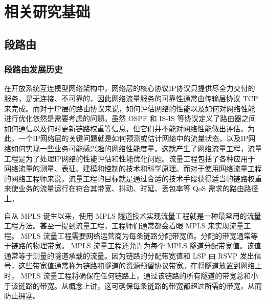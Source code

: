 
\chapter{相关研究基础}


\section{段路由}

\subsection{段路由发展历史}

在开放系统互连模型网络架构中，网络层的核心协议IP协议只提供尽全力交付的服务，是无连接、不可靠的，因此网络流量服务的可靠性通常由传输层协议 \gls*{TCP} 来完成。而对于IP层的路由协议来说，如何评估网络的性能以及如何对网络性能进行优化依然是需要考虑的问题。虽然 \gls*{OSPF} 和 \gls*{IS-IS} 等协议定义了路由器之间如何通信以及何时更新链路权重等信息，但它们并不能对网络性能做出评估。为此，一个IP网络层的关键问题就是如何预测或估计网络中的流量状态，以及IP网络如何实现一些业务可能感兴趣的网络性能度量。这就产生了网络流量工程，流量工程是为了处理IP网络的性能评估和性能优化问题。流量工程包括了各种应用于网络流量的测量、表征、建模和控制的技术和科学原理。而对于使用网络流量工程的网络工程师来说，流量工程的目标就是通过合适的技术手段获得适当的链路权重来使业务的流量运行在符合其带宽、抖动、时延、丢包率等 \gls*{QoS} 需求的路由路径上。

自从 \gls*{MPLS} 诞生以来，使用 \gls*{MPLS} 隧道技术实现流量工程就是一种最常用的流量工程方法。甚至一提到流量工程，工程师们通常都会着眼 \gls*{MPLS} 来实现流量工程。 \gls*{MPLS} 流量工程需要网络运营商为每条链路分配带宽值。分配的带宽通常等于链路的物理带宽。 \gls*{MPLS} 流量工程还允许为每个 \gls*{MPLS} 隧道分配带宽值。该值通常等于测量的隧道承载的流量。因为链路的分配带宽值和 \gls*{LSP} 由 \gls*{RSVP} 发出信号，这些带宽值通常称为链路和隧道的资源预留协议带宽。在将隧道放置到网络上时， \gls*{MPLS} 流量工程将确保在任何链路上，通过该链路的所有隧道的带宽总和小于该链路的带宽。从概念上讲，这可确保每条链路的带宽都超过所需的带宽，从而防止拥塞。

